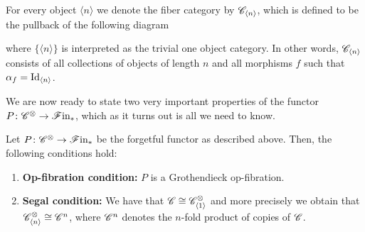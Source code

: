     \begin{rem}\label{rem:fibercategory} For every object $\langle n \rangle$ we
         denote the fiber category by $\mathscr{C}_{\langle n \rangle}$, which is defined
         to be the pullback of the following diagram
        \begin{center}
        \end{center}
        where $\{\langle n \rangle\}$ is interpreted as the trivial one object
        category. In other words, $\mathscr{C}_{\langle n \rangle}$ consists of all
        collections of objects of length $n$ and all morphisms $f$ such that
        $\alpha_f = \operatorname{Id}_{\langle n \rangle}$.    
    \end{rem}

    We are now ready to state two very important properties of the functor $P
    \colon \mathscr{C}^{\otimes} \to \mathscr{F} \text{in}_{\ast}$, which as it turns out is all we need to know.
    
    \begin{prop}\label{m1m2} Let $P \colon \mathscr{C}^{\otimes} \to \mathscr{F} \text{in}_{\ast}$ be the forgetful
        functor as described above. Then, the following conditions hold:
            \begin{enumerate}[(M1)]
                \item \textbf{Op-fibration condition:} $P$  is a Grothendieck
                op-fibration. 
                \item \textbf{Segal condition:} We have that $\mathscr{C} \cong
                \mathscr{C}^{\otimes}_{\langle 1 \rangle}$ and more precisely we obtain that
                $\mathscr{C}^{\otimes}_{\langle n \rangle} \cong \mathscr{C}^n$, where $\mathscr{C}^n$ denotes
                the $n$-fold product of  copies of $\mathscr{C}$. 
            \end{enumerate}
    \end{prop}

